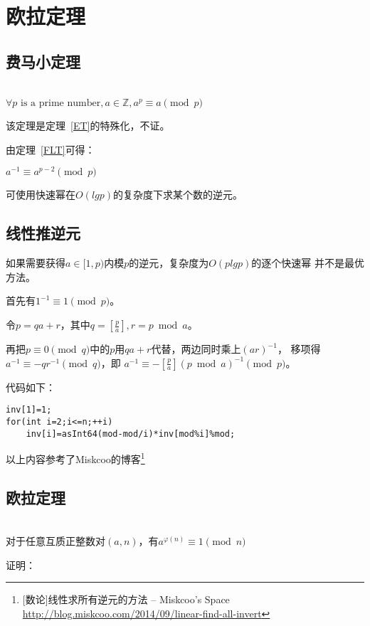 \section{欧拉定理}
\subsection{费马小定理}\label{FLTS}
\begin{theorem}\label{FLT}
	~\\
	$\forall p \textrm{ is a prime number},a\in \mathbb{Z},a^p \equiv a \pmod{p}$
\end{theorem}

该定理是定理~\ref{ET}的特殊化，不证。

由定理~\ref{FLT}可得：

\begin{inference}
	$a^{-1} \equiv a^{p-2} \pmod{p}$
\end{inference}

可使用快速幂在$O(lgp)$的复杂度下求某个数的逆元。

\subsection{线性推逆元}

如果需要获得$a\in [1,p)$内模$p$的逆元，复杂度为$O(plgp)$的逐个快速幂
并不是最优方法。

首先有$1^{-1}\equiv 1 \pmod{p}$。

令$p=qa+r$，其中$q=[\frac{p}{a}],r=p \bmod a$。

再把$p \equiv 0 \pmod{q}$中的$p$用$qa+r$代替，两边同时乘上$(ar)^{-1}$，
移项得$a^{-1}\equiv -qr^{-1} \pmod{q}$，即
$a^{-1}\equiv -[\frac{p}{a}](p \bmod a)^{-1} \pmod{p}$。

代码如下：
\begin{lstlisting}[title=inv]
inv[1]=1;
for(int i=2;i<=n;++i)
    inv[i]=asInt64(mod-mod/i)*inv[mod%i]%mod;
\end{lstlisting}

以上内容参考了Miskcoo的博客\footnote{[数论]线性求所有逆元的方法 – Miskcoo's Space
	\url{http://blog.miskcoo.com/2014/09/linear-find-all-invert}}

\subsection{欧拉定理}
\begin{theorem}\label{ET}
	~\\
	对于任意互质正整数对$(a,n)$，有$a^{\varphi(n)} \equiv 1 \pmod{n}$
\end{theorem}
证明：

